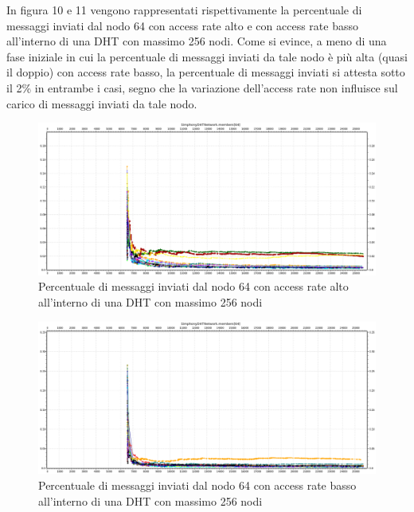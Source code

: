 \documentclass[	
	DIV=calc,
	paper=a4,
	fontsize=11pt,
	onecolumn
]{scrartcl} %
\begin{document}
	In figura 10 e 11 vengono rappresentati rispettivamente la percentuale di messaggi inviati dal nodo 64 con access rate alto e con access rate basso all'interno di una DHT con massimo 256 nodi. Come si evince, a meno di una fase iniziale in cui la percentuale di messaggi inviati da tale nodo è più alta (quasi il doppio) con access rate basso, la percentuale di messaggi inviati si attesta sotto il 2\% in entrambe i casi, segno che la variazione dell'access rate non influisce sul carico di messaggi inviati da tale nodo.
	
	\begin{figure}[H]
		\centering
		\includegraphics[scale=0.35]	{SymphonyDHT/plots/PercentageOfMessagesSent/256_Nodes_FastAccess/SymphonyDHT_256Nodes_FastAccess_Node64.png}
		\caption{Percentuale di messaggi inviati dal nodo 64 con access rate alto all'interno di una DHT con massimo 256 nodi}
		\label{Figura 10}
	\end{figure}
	\begin{figure}[H]
		\centering
		\includegraphics[scale=0.35]	{SymphonyDHT/plots/PercentageOfMessagesSent/256_Nodes_SlowAccess/SymphonyDHT_256Nodes_SlowAccess_Node64.png}
		\caption{Percentuale di messaggi inviati dal nodo 64 con access rate basso all'interno di una DHT con massimo 256 nodi}
		\label{Figura 11}
	\end{figure}	
	
\end{document}

